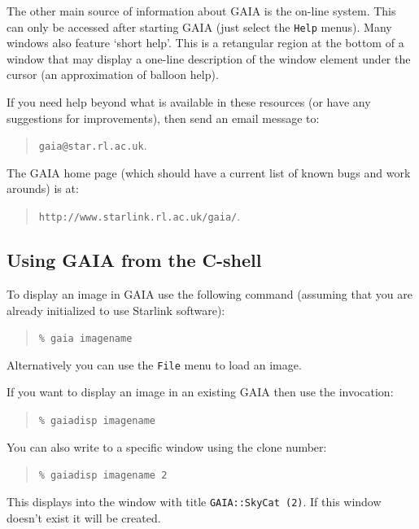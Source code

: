 \documentclass[twoside,11pt]{article}
\newcommand{\htmladdnormallink}[2]{#1}
\newcommand{\xref}[3]{#1}
\newcommand{\xlabel}[1]{}
\renewcommand{\_}{\texttt{\symbol{95}}}
\newcommand{\mytt}[1]{{\texttt{#1}}}
\begin{document}

The other main source of information about GAIA is the on-line
system. This can only be accessed after starting GAIA (just select the
\mytt{Help} menus). Many windows also feature `short help'. This is a
retangular region at the bottom of a window that may display a
one-line description of the window element under the cursor (an
approximation of balloon help).

If you need help beyond what is available in these resources (or have
any suggestions for improvements), then send an email message to:
\begin{quote}
\htmladdnormallink{\mytt{gaia@star.rl.ac.uk}}{mailto:gaia@star.rl.ac.uk}.
\end{quote}
The GAIA home page (which should have a current list of known bugs and
work arounds) is at:
\begin{quote}
\htmladdnormallink{\mytt{http://www.starlink.rl.ac.uk/gaia/}}{http://www.starlink.rl.ac.uk/gaia/}.
\end{quote}

\subsection{\xlabel{using_gaia_from_the_cshell}Using GAIA from the C-shell}

To display an image in GAIA use the following command
(assuming that you are already initialized to use Starlink software):
\begin{quote}
\mytt{\% gaia image\_name}
\end{quote}
Alternatively you can use the \mytt{File} menu to load an image.

If you want to display an image in an existing GAIA then use the
invocation:
\begin{quote}
\mytt{\% gaiadisp image\_name}
\end{quote}
You can also write to a specific window using the clone number:
\begin{quote}
\mytt{\% gaiadisp image\_name 2}
\end{quote}
This displays into the window with title \mytt{GAIA::SkyCat (2)}. If
this window doesn't exist it will be created.
\end{document}
